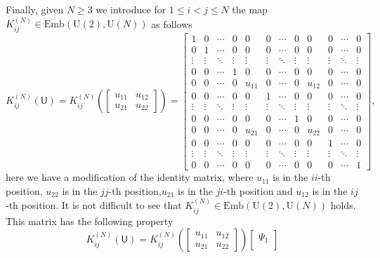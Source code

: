 \documentclass[a4paper,11pt]{article}
\newcommand{\rU}{\mathsf{U}}
\begin{document}
\begin{appendices}
  
  Finally, given $N\ge 3$ we introduce for $1 \le i < j \le N$ the map $K_{ij}^{(N)}\in \mathrm{Emb}(\mathrm{U}(2),\mathrm{U}(N))$ as follows
  $$
  K_{ij}^{(N)}(\rU) = K_{ij}^{(N)}\left(\begin{bmatrix}
    u_{11} & u_{12} \\
    u_{21} & u_{22}
  \end{bmatrix}\right)
  = 
  \left[
  \begin{array}{cccccccccccc}
   1 & 0 & \cdots & 0 & 0 & 0 & \cdots & 0 & 0 & 0 & \cdots & 0 \\
   0 & 1  &\cdots &0& 0 & 0  &\cdots & 0 & 0 & 0 & \cdots& 0 \\
  \vdots & \vdots &\ddots & \vdots & \vdots & \vdots & \ddots &\vdots& \vdots &\vdots& \ddots &\vdots \\
  0 & 0  &\cdots &1& 0 & 0  &\cdots & 0 & 0 & 0 & \cdots& 0 \\
   0 & 0  &\cdots &0& u_{11} & 0  &\cdots & 0 & u_{12} & 0 & \cdots& 0  \\
   0 & 0  &\cdots &0& 0 & 1  &\cdots & 0 & 0 & 0 & \cdots& 0  \\
  \vdots & \vdots &\ddots & \vdots & \vdots & \vdots & \ddots &\vdots& \vdots &\vdots& \ddots &\vdots \\
   0 & 0  &\cdots &0& 0 & 0  &\cdots & 1 & 0 & 0 & \cdots& 0 \\
   0 & 0  &\cdots &0& u_{21} & 0  &\cdots & 0 & u_{22} & 0 & \cdots& 0  \\
   0 & 0  &\cdots &0& 0 & 0  &\cdots & 0 & 0 & 1 & \cdots& 0  \\
  \vdots & \vdots &\ddots & \vdots & \vdots & \vdots & \ddots &\vdots& \vdots &\vdots& \ddots &\vdots \\
  0 & 0 & \cdots & 0 & 0 & 0 & \cdots & 0 & 0 & 0 & \cdots & 1
  \end{array}\right],
  $$
  here we have a modification of the identity matrix, where $u_{11}$ is in the $ii$-th position, $u_{22}$ is in the $jj$-th position,$u_{21}$ is in the $ji$-th position and $u_{12}$ is in the $ij$-th position. It is not difficult to see that $K_{ij}^{(N)} \in \mathrm{Emb}(\mathrm{U}(2),\mathrm{U}(N))$ holds. This matrix has the following property
  $$
  K_{ij}^{(N)}(\rU) = K_{ij}^{(N)}\left(\begin{bmatrix}
    u_{11} & u_{12} \\
    u_{21} & u_{22}
  \end{bmatrix}\right)\begin{bmatrix}
  \Psi_1 \\

\end{bmatrix}$$
\end{appendices}
\end{document}
